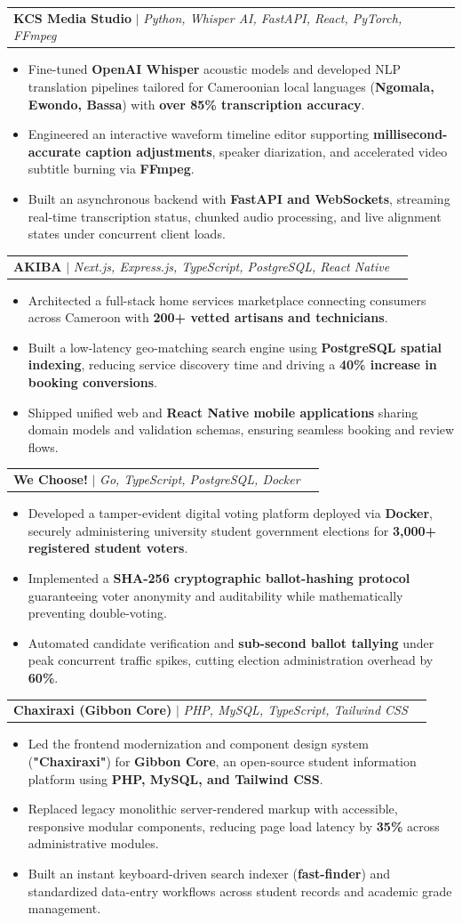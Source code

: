 \documentclass[letterpaper,10pt]{article}
\makeatletter
\newcommand{\resumeItem}[1]{
  \item\small{
    {#1 \vspace{-1.5pt}}
  }
}
\newcommand{\resumeProjectHeading}[2]{
    \item
    \begin{tabular*}{0.98\textwidth}{l@{\extracolsep{\fill}}r}
      \small#1 & #2 \\
    \end{tabular*}\vspace{-5pt}
}
\newcommand{\resumeItemListStart}{\begin{itemize}[leftmargin=0.2in, label={$\vcenter{\hbox{\tiny$\bullet$}}$}, itemsep=1.2pt, parsep=0pt]}
\newcommand{\resumeItemListEnd}{\end{itemize}\vspace{-3pt}}
\makeatother
\begin{document}
    \resumeProjectHeading
        {\textbf{KCS Media Studio} $|$ \emph{Python, Whisper AI, FastAPI, React, PyTorch, FFmpeg}}{}
        \resumeItemListStart
          \resumeItem{Fine-tuned \textbf{OpenAI Whisper} acoustic models and developed NLP translation pipelines tailored for Cameroonian local languages (\textbf{Ngomala, Ewondo, Bassa}) with \textbf{over 85\% transcription accuracy}.}
          \resumeItem{Engineered an interactive waveform timeline editor supporting \textbf{millisecond-accurate caption adjustments}, speaker diarization, and accelerated video subtitle burning via \textbf{FFmpeg}.}
          \resumeItem{Built an asynchronous backend with \textbf{FastAPI and WebSockets}, streaming real-time transcription status, chunked audio processing, and live alignment states under concurrent client loads.}
        \resumeItemListEnd

    \pagebreak

    \resumeProjectHeading
        {\textbf{AKIBA} $|$ \emph{Next.js, Express.js, TypeScript, PostgreSQL, React Native}}{}
        \resumeItemListStart
          \resumeItem{Architected a full-stack home services marketplace connecting consumers across Cameroon with \textbf{200+ vetted artisans and technicians}.}
          \resumeItem{Built a low-latency geo-matching search engine using \textbf{PostgreSQL spatial indexing}, reducing service discovery time and driving a \textbf{40\% increase in booking conversions}.}
          \resumeItem{Shipped unified web and \textbf{React Native mobile applications} sharing domain models and validation schemas, ensuring seamless booking and review flows.}
        \resumeItemListEnd

    \resumeProjectHeading
        {\textbf{We Choose\string!} $|$ \emph{Go, TypeScript, PostgreSQL, Docker}}{}
        \resumeItemListStart
          \resumeItem{Developed a tamper-evident digital voting platform deployed via \textbf{Docker}, securely administering university student government elections for \textbf{3,000+ registered student voters}.}
          \resumeItem{Implemented a \textbf{SHA-256 cryptographic ballot-hashing protocol} guaranteeing voter anonymity and auditability while mathematically preventing double-voting.}
          \resumeItem{Automated candidate verification and \textbf{sub-second ballot tallying} under peak concurrent traffic spikes, cutting election administration overhead by \textbf{60\%}.}
        \resumeItemListEnd

    \resumeProjectHeading
        {\textbf{Chaxiraxi (Gibbon Core)} $|$ \emph{PHP, MySQL, TypeScript, Tailwind CSS}}{}
        \resumeItemListStart
          \resumeItem{Led the frontend modernization and component design system (\textbf{"Chaxiraxi"}) for \textbf{Gibbon Core}, an open-source student information platform using \textbf{PHP, MySQL, and Tailwind CSS}.}
          \resumeItem{Replaced legacy monolithic server-rendered markup with accessible, responsive modular components, reducing page load latency by \textbf{35\%} across administrative modules.}
          \resumeItem{Built an instant keyboard-driven search indexer (\textbf{fast-finder}) and standardized data-entry workflows across student records and academic grade management.}
        \resumeItemListEnd
\end{document}
